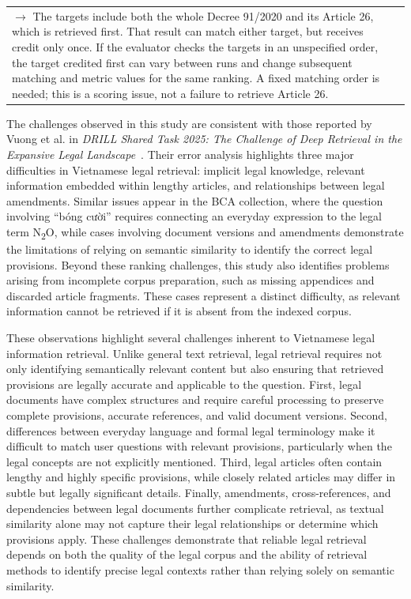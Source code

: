 \begin{longtable}{@{}>{\raggedright\arraybackslash}p{3cm}>{\raggedright\arraybackslash}p{12.25cm}@{}}
\(\rightarrow\) The targets include both the whole Decree 91/2020 and its Article 26, which is retrieved first. That result can match either target, but receives credit only once. If the evaluator checks the targets in an unspecified order, the target credited first can vary between runs and change subsequent matching and metric values for the same ranking. A fixed matching order is needed; this is a scoring issue, not a failure to retrieve Article 26.\\
\end{longtable}
\endgroup


The challenges observed in this study are consistent with those reported by Vuong et al. in \emph{DRILL Shared Task 2025: The Challenge of Deep Retrieval in the Expansive Legal Landscape}~\cite{vuong2026drill}. Their error analysis highlights three major difficulties in Vietnamese legal retrieval: implicit legal knowledge, relevant information embedded within lengthy articles, and relationships between legal amendments. Similar issues appear in the BCA collection, where the question involving ``bóng cười'' requires connecting an everyday expression to the legal term N\textsubscript{2}O, while cases involving document versions and amendments demonstrate the limitations of relying on semantic similarity to identify the correct legal provisions. Beyond these ranking challenges, this study also identifies problems arising from incomplete corpus preparation, such as missing appendices and discarded article fragments. These cases represent a distinct difficulty, as relevant information cannot be retrieved if it is absent from the indexed corpus.

These observations highlight several challenges inherent to Vietnamese legal information retrieval. Unlike general text retrieval, legal retrieval requires not only identifying semantically relevant content but also ensuring that retrieved provisions are legally accurate and applicable to the question. First, legal documents have complex structures and require careful processing to preserve complete provisions, accurate references, and valid document versions. Second, differences between everyday language and formal legal terminology make it difficult to match user questions with relevant provisions, particularly when the legal concepts are not explicitly mentioned. Third, legal articles often contain lengthy and highly specific provisions, while closely related articles may differ in subtle but legally significant details. Finally, amendments, cross-references, and dependencies between legal documents further complicate retrieval, as textual similarity alone may not capture their legal relationships or determine which provisions apply. These challenges demonstrate that reliable legal retrieval depends on both the quality of the legal corpus and the ability of retrieval methods to identify precise legal contexts rather than relying solely on semantic similarity.


